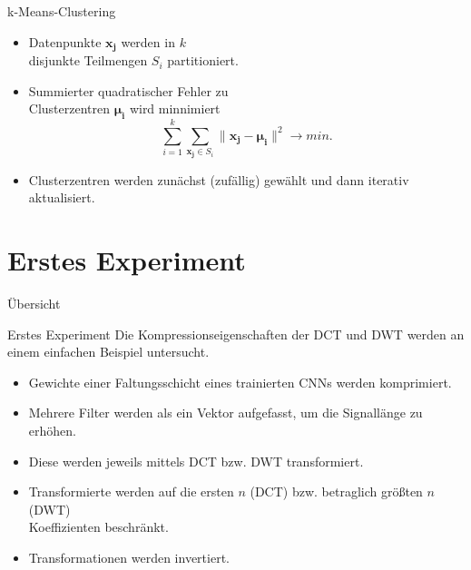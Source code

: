 \documentclass[aspectratio=169, 12pt]{beamer}
\begin{document}
\begin{frame}{k-Means-Clustering}
  \begin{figure}
    \vspace{-0.5cm}
    \resizebox{7cm}{!}{%
      
    }
  \end{figure}
  \leavevmode
  \begin{itemize}
    \item Datenpunkte $\symbf{x_j}$ werden in $k$ \\ disjunkte Teilmengen $S_i$ partitioniert.
    \item Summierter quadratischer Fehler zu \\ Clusterzentren $\symbf{\mu_i}$ wird minnimiert
          \begin{equation*}
            \sum_{i=1}^{k} \sum_{\symbf{x_j} \in S_i} \lVert \symbf{x_j} - \symbf{\mu_i} \rVert^2 \rightarrow min.
          \end{equation*}
    \item Clusterzentren werden zunächst (zufällig) gewählt und dann iterativ aktualisiert.
  \end{itemize}
\end{frame}


\section{Erstes Experiment}

\begin{frame}{Übersicht}
  \tableofcontents[currentsection]
\end{frame}

\begin{frame}{Erstes Experiment}
  Die Kompressionseigenschaften der DCT und DWT werden an einem einfachen Beispiel untersucht.
  \begin{itemize}
    \item Gewichte einer Faltungsschicht eines trainierten CNNs werden komprimiert.
    \item Mehrere Filter werden als ein Vektor aufgefasst, um die Signallänge zu erhöhen.
    \item Diese werden jeweils mittels DCT bzw. DWT transformiert.
    \item Transformierte werden auf die ersten $n$ (DCT) bzw. betraglich größten $n$ (DWT) \\ Koeffizienten beschränkt.
    \item Transformationen werden invertiert.
  \end{itemize}
\end{frame}
\end{document}
